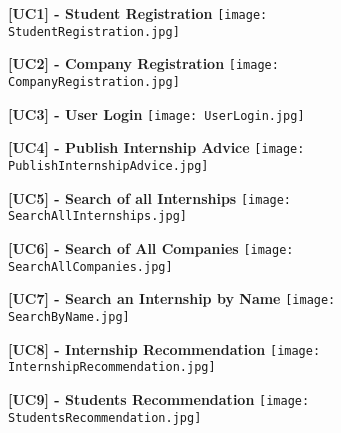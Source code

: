 			\begin{figure}[H]
				\centering
				{\bfseries [UC1] - Student Registration}
				\texttt{[image: StudentRegistration.jpg]}
				
			\end{figure}
			
			\begin{figure}[H]
				\centering
				{\bfseries [UC2] - Company Registration}
				\texttt{[image: CompanyRegistration.jpg]}
				
			\end{figure}
			
			\begin{figure}[H]
				\centering
				{\bfseries [UC3] - User Login}
				\texttt{[image: UserLogin.jpg]}
				
			\end{figure}
			
			\begin{figure}[H]
				\centering
				{\bfseries [UC4] - Publish Internship Advice}
				\texttt{[image: PublishInternshipAdvice.jpg]}
				
			\end{figure}
			
		
			\begin{figure}[H]
				\centering
				{\bfseries [UC5] - Search of all Internships}
				\texttt{[image: SearchAllInternships.jpg]}
				
			\end{figure}
			
			\begin{figure}[H]
				\centering
				{\bfseries [UC6] - Search of All Companies}
				\texttt{[image: SearchAllCompanies.jpg]}
				
			\end{figure}
			
			\begin{figure}[H]
				\centering
				{\bfseries [UC7] - Search an Internship by Name}
				\texttt{[image: SearchByName.jpg]}
				
			\end{figure}
			
			\begin{figure}[H]
				\centering
				{\bfseries [UC8] - Internship Recommendation}
				\texttt{[image: InternshipRecommendation.jpg]}
				
			\end{figure}
			
			\begin{figure}[H]
				\centering
				{\bfseries [UC9] - Students Recommendation}
				\texttt{[image: StudentsRecommendation.jpg]}
				
			\end{figure}
			
